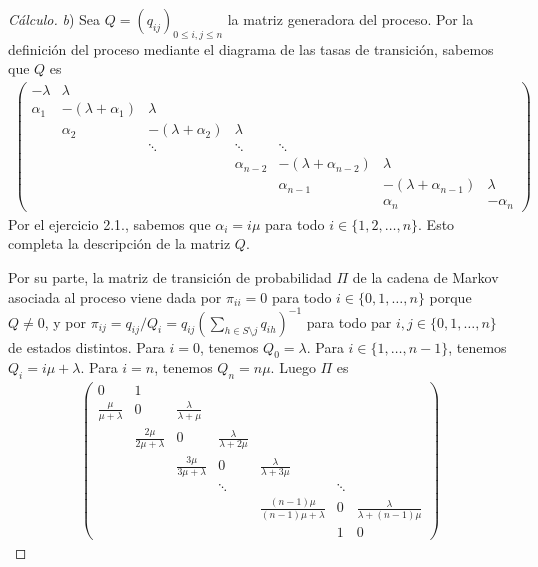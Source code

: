 \documentclass{article}
\theoremstyle{definition}
\begin{document}
\begin{proof}[Cálculo] \textit{b})
Sea \(Q = (q_{i j})_{0 \leq i, j \leq n}\) la matriz generadora del proceso.
Por la definición del proceso mediante el diagrama de las tasas de transición, sabemos que \(Q\) es
\begin{align}
	\begin{pmatrix}
		- \lambda & \lambda \\
		\alpha_1 & -(\lambda + \alpha_1) & \lambda \\
		 & \alpha_2 & -(\lambda + \alpha_2) & \lambda \\
		 & & \ddots & \ddots & \ddots \\
		 & & & \alpha_{n - 2} & -(\lambda + \alpha_{n - 2}) & \lambda \\
		 & & & &\alpha_{n - 1} & -(\lambda + \alpha_{n - 1}) & \lambda \\
		 & & & & &\alpha_n & - \alpha_n
	\end{pmatrix}
\end{align}
Por el ejercicio 2.1., sabemos que \(\alpha_i = i \mu\) para todo \(i \in \{1, 2, \dots, n\}\).
Esto completa la descripción de la matriz \(Q\).


Por su parte, la matriz de transición de probabilidad \(\Pi\) de la cadena de Markov asociada al proceso viene dada por \(\pi_{i i} = 0\) para todo \(i \in \{0, 1, \dots, n\}\) porque \(Q \neq 0\), y por \(\pi_{i j} = q_{i j} / Q_i = q_{i j} \left( \sum_{h \in S \setminus j} q_{i h} \right)^{- 1}\) para todo par \(i, j \in \{0, 1, \dots, n\}\) de estados distintos.
Para \(i = 0\), tenemos \(Q_0 = \lambda\).
Para \(i \in \{1, \dots, n - 1\}\), tenemos \(Q_i = i \mu + \lambda\).
Para \(i = n\), tenemos \(Q_n = n \mu\).
Luego \(\Pi\) es
\begin{align}
	\begin{pmatrix}
		0 & 1  \\
		\frac{\mu}{\mu + \lambda} & 0 & \frac{\lambda}{ \lambda + \mu} \\ 
		 & \frac{2 \mu}{2 \mu + \lambda} & 0 & \frac{\lambda}{\lambda + 2 \mu} \\
		 & & \frac{3 \mu}{3 \mu + \lambda} & 0 & \frac{\lambda}{\lambda + 3 \mu} \\
		 & & & \ddots & & \ddots \\
		 & & & & \frac{(n - 1) \mu}{(n - 1) \mu + \lambda} & 0 & \frac{\lambda}{\lambda + (n - 1) \mu} \\
		 & & & & & 1 & 0
	\end{pmatrix}
\end{align}
\end{proof}
\end{document}
